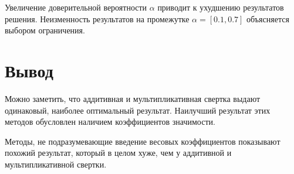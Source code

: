 Увеличение доверительной вероятности $\alpha$ приводит к ухудшению результатов решения. Неизменность результатов на промежутке $\alpha=[0.1, 0.7]$ объясняется выбором ограничения.

\section{Вывод}

Можно заметить, что аддитивная и мультипликативная свертка выдают одинаковый, наиболее оптимальный результат. Наилучший результат этих методов обусловлен наличием коэффициентов значимости.

Методы, не подразумевающие введение весовых коэффициентов показывают похожий результат, который в целом хуже, чем у аддитивной и мультипликативной свертки.
